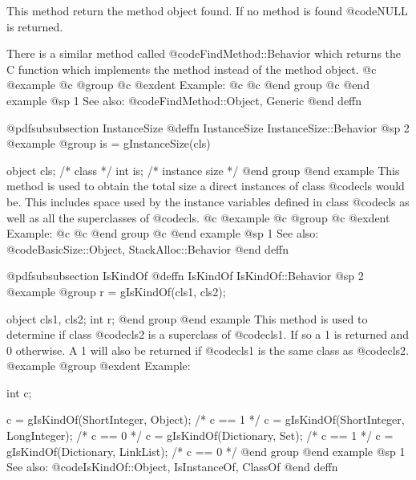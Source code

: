 This method return the method object found.  If no method is found
@code{NULL} is returned.

There is a similar method called @code{FindMethod::Behavior} which
returns the C function which implements the method instead of the method
object.
@c @example
@c @group
@c @exdent Example:
@c 
@c @end group
@c @end example
@sp 1
See also:  @code{FindMethod::Object, Generic}
@end deffn














@pdfsubsubsection {InstanceSize}
@deffn {InstanceSize} InstanceSize::Behavior
@sp 2
@example
@group
is = gInstanceSize(cls)

object  cls;    /* class                */
int     is;     /* instance size        */
@end group
@end example
This method is used to obtain the total size a direct instances of class
@code{cls} would be.  This includes space used by the instance variables
defined in class @code{cls} as well as all the superclasses of
@code{cls}.
@c @example
@c @group
@c @exdent Example:
@c 
@c @end group
@c @end example
@sp 1
See also:  @code{BasicSize::Object, StackAlloc::Behavior}
@end deffn










@pdfsubsubsection {IsKindOf}
@deffn {IsKindOf} IsKindOf::Behavior
@sp 2
@example
@group
r = gIsKindOf(cls1, cls2);

object  cls1, cls2;
int     r;
@end group
@end example
This method is used to determine if class @code{cls2} is a
superclass of @code{cls1}.  If so a 1 is returned and 0 otherwise.
A 1 will also be returned if @code{cls1} is the same class as @code{cls2}.
@example
@group
@exdent Example:

int     c;

c = gIsKindOf(ShortInteger, Object);      /* c == 1  */
c = gIsKindOf(ShortInteger, LongInteger); /* c == 0  */
c = gIsKindOf(Dictionary, Set);           /* c == 1  */
c = gIsKindOf(Dictionary, LinkList);      /* c == 0  */
@end group
@end example
@sp 1
See also:  @code{IsKindOf::Object, IsInstanceOf, ClassOf}
@end deffn











